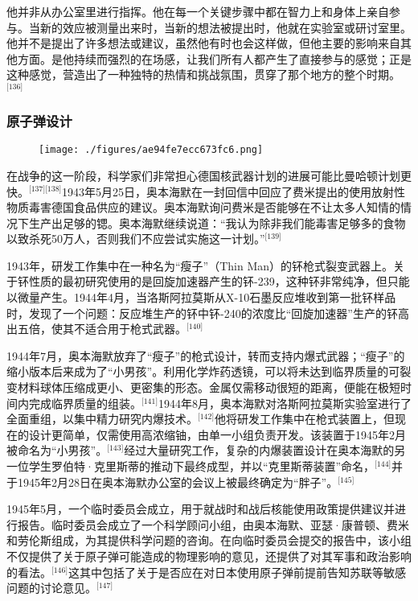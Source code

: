 他并非从办公室里进行指挥。他在每一个关键步骤中都在智力上和身体上亲自参与。当新的效应被测量出来时，当新的想法被提出时，他就在实验室或研讨室里。他并不是提出了许多想法或建议，虽然他有时也会这样做，但他主要的影响来自其他方面。是他持续而强烈的在场感，让我们所有人都产生了直接参与的感觉；正是这种感觉，营造出了一种独特的热情和挑战氛围，贯穿了那个地方的整个时期。\(^\text{[136]}\)
\subsubsection{原子弹设计}
\begin{figure}[ht]
\centering
\texttt{[image: ./figures/ae94fe7ecc673fc6.png]}
\caption{} \label{fig_ABHM_6}
\end{figure}
在战争的这一阶段，科学家们非常担心德国核武器计划的进展可能比曼哈顿计划更快。\(^\text{[137][138]}\)1943年5月25日，奥本海默在一封回信中回应了费米提出的使用放射性物质毒害德国食品供应的建议。奥本海默询问费米是否能够在不让太多人知情的情况下生产出足够的锶。奥本海默继续说道：“我认为除非我们能毒害足够多的食物以致杀死50万人，否则我们不应尝试实施这一计划。”\(^\text{[139]}\)

1943年，研发工作集中在一种名为“瘦子”（Thin Man）的钚枪式裂变武器上。关于钚性质的最初研究使用的是回旋加速器产生的钚-239，这种钚非常纯净，但只能以微量产生。1944年4月，当洛斯阿拉莫斯从X-10石墨反应堆收到第一批钚样品时，发现了一个问题：反应堆生产的钚中钚-240的浓度比“回旋加速器”生产的钚高出五倍，使其不适合用于枪式武器。\(^\text{[140]}\)

1944年7月，奥本海默放弃了“瘦子”的枪式设计，转而支持内爆式武器；“瘦子”的缩小版本后来成为了“小男孩”。利用化学炸药透镜，可以将未达到临界质量的可裂变材料球体压缩成更小、更密集的形态。金属仅需移动很短的距离，便能在极短时间内完成临界质量的组装。\(^\text{[141]}\)1944年8月，奥本海默对洛斯阿拉莫斯实验室进行了全面重组，以集中精力研究内爆技术。\(^\text{[142]}\)他将研发工作集中在枪式装置上，但现在的设计更简单，仅需使用高浓缩铀，由单一小组负责开发。该装置于1945年2月被命名为“小男孩”。\(^\text{[143]}\)经过大量研究工作，复杂的内爆装置设计在奥本海默的另一位学生罗伯特·克里斯蒂的推动下最终成型，并以“克里斯蒂装置”命名，\(^\text{[144]}\)并于1945年2月28日在奥本海默办公室的会议上被最终确定为“胖子”。\(^\text{[145]}\)

1945年5月，一个临时委员会成立，用于就战时和战后核能使用政策提供建议并进行报告。临时委员会成立了一个科学顾问小组，由奥本海默、亚瑟·康普顿、费米和劳伦斯组成，为其提供科学问题的咨询。在向临时委员会提交的报告中，该小组不仅提供了关于原子弹可能造成的物理影响的意见，还提供了对其军事和政治影响的看法。\(^\text{[146]}\)这其中包括了关于是否应在对日本使用原子弹前提前告知苏联等敏感问题的讨论意见。\(^\text{[147]}\)
